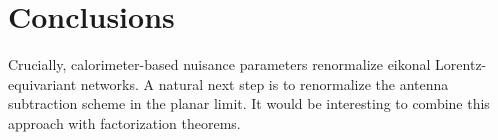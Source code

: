 \section{Conclusions}\label{sec:conclusions}

Crucially, calorimeter-based nuisance parameters renormalize eikonal
Lorentz-equivariant networks. A natural next step is to renormalize the
antenna subtraction scheme in the planar limit. It would be interesting
to combine this approach with factorization theorems.

